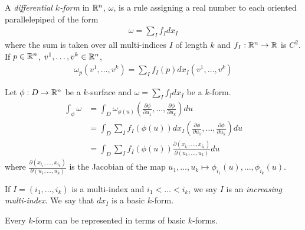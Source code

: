 \documentclass[11pt]{article}
\begin{document}
\begin{definition} A \emph{differential $k$-form} in $\mathbb{R}^n$, $\omega$, is a rule assigning a real number to each oriented parallelepiped of the form \begin{align*} \omega = \sum_I f_I dx_I \end{align*} where the sum is taken over all multi-indices $I$ of length $k$ and $f_I: \mathbb{R}^n \to \mathbb{R}$ is $C^2$. If $p \in \mathbb{R}^n$, $v^1, \dots, v^k \in \mathbb{R}^n$, \begin{align*} \omega_p (v^1, \dots, v^k) = \sum_I f_I (p) dx_I (v^1, \dots, v^k) \end{align*}
\end{definition}

\begin{definition} Let $\phi: D \to \mathbb{R}^n$ be a $k$-surface and $\omega = \sum_I f_I dx_I$ be a $k$-form. \begin{align*} \int_{\phi} \omega & = \int_D \omega_{\phi(u)} \left( \frac{\partial \phi}{\partial u_1} , \dots, \frac{\partial \phi}{\partial u_k} \right) du \\ & = \int_D \sum_I f_I(\phi(u)) dx_I \left( \frac{\partial \phi}{\partial u_1} , \dots, \frac{\partial \phi}{\partial u_k} \right) du \\ & = \int_D \sum_I f_I (\phi(u)) \frac{\partial(x_{i_1}, \dots, x_{i_k})}{\partial (u_1, \dots, u_k)} du \end{align*} where $\frac{\partial(x_{i_1}, \dots, x_{i_k})}{\partial (u_1, \dots, u_k)}$ is the Jacobian of the map $u_1, \dots, u_k \mapsto \phi_{i_1}(u), \dots, \phi_{i_k}(u)$.
\end{definition}

  
\begin{definition} If $I = (i_1, \dots, i_k)$ is a multi-index and $i_1 < \dots < i_k$, we say $I$ is an \emph{increasing multi-index}. We say that $dx_I$ is a basic $k$-form.
\end{definition}

\begin{remark} Every $k$-form can be represented in terms of basic $k$-forms.
\end{remark}
\end{document}
